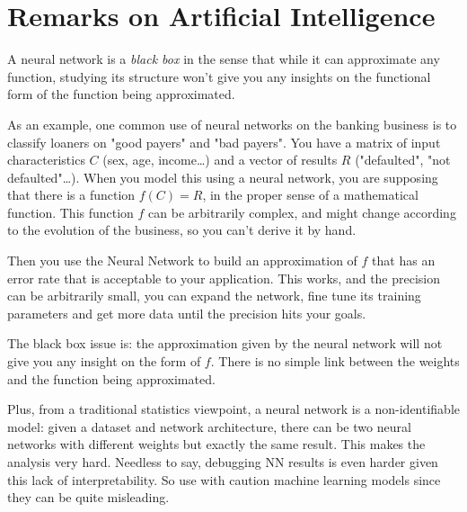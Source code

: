 \section{Remarks on Artificial Intelligence}

A neural network is a \emph{black box} in the sense that while it can approximate any function, studying its structure won't give you any insights on the functional form of the function being approximated.

As an example, one common use of neural networks on the banking business is to classify loaners on "good payers" and "bad payers". You have a matrix of input characteristics $C$ (sex, age, income\ldots) and a vector of results $R$ ("defaulted", "not defaulted"\ldots). When you model this using a neural network, you are supposing that there is a function $f(C)=R$, in the proper sense of a mathematical function. This function $f$ can be arbitrarily complex, and might change according to the evolution of the business, so you can't derive it by hand.

Then you use the Neural Network to build an approximation of $f$ that has an error rate that is acceptable to your application. This works, and the precision can be arbitrarily small, you can expand the network, fine tune its training parameters and get more data until the precision hits your goals.

The black box issue is: the approximation given by the neural network will not give you any insight on the form of $f$. There is no simple link between the weights and the function being approximated. 

Plus, from a traditional statistics viewpoint, a neural network is a non-identifiable model: given a dataset and network architecture, there can be two neural networks with different weights but exactly the same result. This makes the analysis very hard.
Needless to say, debugging NN results is even harder given this lack of interpretability. So use with caution machine learning models since they can be quite misleading.
 
